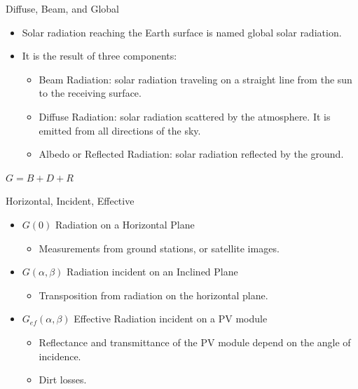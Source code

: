 \documentclass[xcolor={usenames,svgnames,dvipsnames}]{beamer}
\begin{document}
\begin{frame}[label={sec:orgeee90ac}]{Diffuse, Beam, and Global}
\begin{itemize}
\item Solar radiation reaching the Earth surface is named \alert{global solar radiation}.
\item It is the result of three components:
\begin{itemize}
\item \alert{Beam Radiation}: solar radiation traveling on a straight line from the sun to the receiving surface.
\item \alert{Diffuse Radiation}: solar radiation scattered by the atmosphere. It is emitted from all directions of the sky.
\item \alert{Albedo or Reflected Radiation}: solar radiation reflected by the ground.
\end{itemize}
\end{itemize}

\begin{center}
\(G = B + D + R\)
\end{center}
\end{frame}

\begin{frame}[label={sec:org98e8507}]{Horizontal, Incident, Effective}
\begin{itemize}
\item \(G(0)\) \alert{Radiation on a Horizontal Plane} 
\begin{itemize}
\item Measurements from ground stations, or satellite images.
\end{itemize}
\item \(G(\alpha, \beta)\) \alert{Radiation incident on an Inclined Plane}
\begin{itemize}
\item Transposition from radiation on the horizontal plane.
\end{itemize}
\item \(G_{ef}(\alpha, \beta)\) \alert{Effective Radiation incident on a PV module}
\begin{itemize}
\item Reflectance and transmittance of the PV module depend on the angle of incidence.
\item Dirt losses.
\end{itemize}
\end{itemize}
\end{frame}
\end{document}
